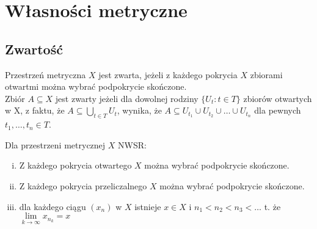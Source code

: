 \documentclass[twoside,10pt]{article}
\theoremstyle{definition}
\theoremstyle{definition}
\theoremstyle{definition}
\theoremstyle{definition}
\theoremstyle{remark}
\theoremstyle{definition}
\theoremstyle{definition}
\theoremstyle{definition}
\theoremstyle{definition}
\theoremstyle{definition}
\theoremstyle{definition}
\begin{document}
\section{Własności metryczne}
\subsection{Zwartość}
\begin{df} Przestrzeń metryczna $X$ jest zwarta, jeżeli z każdego pokrycia $X$ zbiorami otwartmi można wybrać podpokrycie skończone. \\
    Zbiór $A \subseteq X$ jest zwarty jeżeli dla dowolnej rodziny $\{U_t : t \in T\}$ zbiorów otwartych w X, z faktu, że $A \subseteq \bigcup\limits_{t \in T} U_t$,
    wynika, że $A \subseteq U_{t_1} \cup U_{t_2} \cup \ldots \cup U_{t_n}$ dla pewnych $t_1,\ldots,t_n \in T$. \end{df}
\begin{tw} Dla przestrzeni metrycznej $X$ NWSR:
    \begin{enumerate}[(i)]
        \item Z każdego pokrycia otwartego $X$ można wybrać podpokrycie skończone.
        \item Z każdego pokrycia przeliczalnego $X$ można wybrać podpokrycie skończone. 
        \item dla każdego ciągu $(x_n)$ w $X$ istnieje $x \in X$ i $n_1 < n_2 < n_3 < \ldots$ t. że $\lim\limits_{k \rightarrow \infty} x_{n_k} = x$
    \end{enumerate} 
\end{tw}
\end{document}
